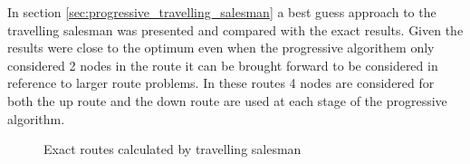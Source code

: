 \documentclass[a4paper,12pt,twoside]{article}
\begin{document}
In section \ref{sec:progressive_travelling_salesman} a best guess approach to the travelling salesman was presented and compared with the exact results. Given the results were close to the optimum even when the progressive algorithem only considered 2 nodes in the route it can be brought forward to be considered in reference to larger route problems. In these routes 4 nodes are considered for both the up route and the down route are used at each stage of the progressive algorithm.

\begin{figure}[H]
	\centering
	
	\caption{Exact routes calculated by travelling salesman}
	\label{fig:exact_routes_calculated_by_travelling_salesman}
\end{figure}
\end{document}
